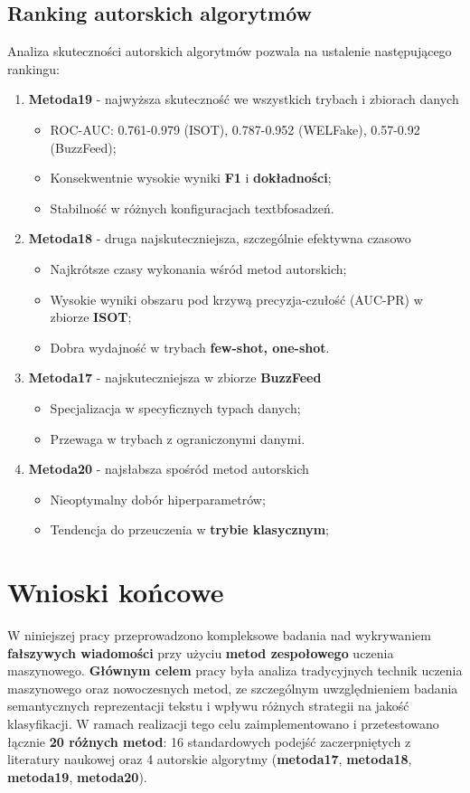 \subsection{Ranking autorskich algorytmów}
Analiza skuteczności autorskich algorytmów pozwala na ustalenie następującego rankingu:
\begin{enumerate}
	\item \textbf{Metoda19} - najwyższa skuteczność we wszystkich trybach i zbiorach danych
	      \begin{itemize}
		      \item ROC-AUC: 0.761-0.979 (ISOT), 0.787-0.952 (WELFake), 0.57-0.92 (BuzzFeed);
		      \item Konsekwentnie wysokie wyniki \textbf{F1} i \textbf{dokładności};
		      \item Stabilność w różnych konfiguracjach textbf{osadzeń}.
	      \end{itemize}
	\item \textbf{Metoda18} - druga najskuteczniejsza, szczególnie efektywna czasowo
	      \begin{itemize}
		      \item Najkrótsze czasy wykonania wśród metod autorskich;
		      \item Wysokie wyniki obszaru pod krzywą precyzja-czułość (AUC-PR) w zbiorze \textbf{ISOT};
		      \item Dobra wydajność w trybach \textbf{few-shot, one-shot}.
	      \end{itemize}
	\item \textbf{Metoda17} - najskuteczniejsza w zbiorze \textbf{BuzzFeed}
	      \begin{itemize}
		      \item Specjalizacja w specyficznych typach danych;
		      \item Przewaga w trybach z ograniczonymi danymi.
	      \end{itemize}
	\item \textbf{Metoda20} - najsłabsza spośród metod autorskich
	      \begin{itemize}
		      \item Nieoptymalny dobór hiperparametrów;
		      \item Tendencja do przeuczenia w \textbf{trybie klasycznym};
	      \end{itemize}
\end{enumerate}

\section{Wnioski końcowe}
W niniejszej pracy przeprowadzono kompleksowe badania nad wykrywaniem \textbf{fałszywych wiadomości} przy użyciu \textbf{metod zespołowego} uczenia maszynowego. \textbf{Głównym celem} pracy była analiza tradycyjnych technik uczenia maszynowego oraz nowoczesnych metod, ze szczególnym uwzględnieniem badania semantycznych reprezentacji tekstu i wpływu różnych strategii na jakość klasyfikacji. W ramach realizacji tego celu zaimplementowano i przetestowano łącznie \textbf{20 różnych metod}: 16 standardowych podejść zaczerpniętych z literatury naukowej oraz 4 autorskie algorytmy (\textbf{metoda17}, \textbf{metoda18}, \textbf{metoda19}, \textbf{metoda20}).

